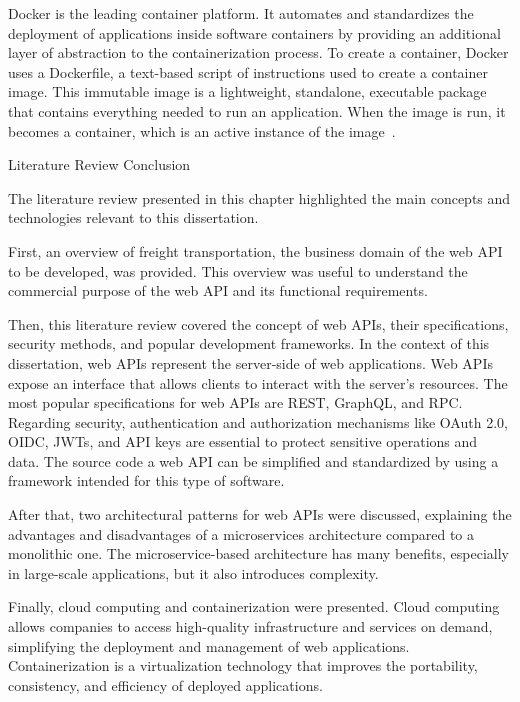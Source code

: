 \documentclass[12pt, reqno]{amsbook}
\makeatletter
\def\section{\@startsection{section}{1}%
      \z@{.5\linespacing\@plus.7\linespacing}{.25\linespacing}%
      {\normalfont\bfseries\flushleft}}
\theoremstyle{definition}
\theoremstyle{definition}
\numberwithin{section}{chapter}
\numberwithin{table}{chapter}
\numberwithin{figure}{chapter}
\makeatother
\begin{document}
Docker is the leading container platform. It automates and standardizes the deployment of applications inside software containers by providing an additional layer of abstraction to the containerization process. To create a container, Docker uses a Dockerfile, a text-based script of instructions used to create a container image. This immutable image is a lightweight, standalone, executable package that contains everything needed to run an application. When the image is run, it becomes a container, which is an active instance of the image~\cite{Figueira2024, Hardikar2021, Potdar2020}.

\section{Literature Review Conclusion}
\label{Section:Literature_Review_Conclusion}

The literature review presented in this chapter highlighted the main concepts and technologies relevant to this dissertation.

First, an overview of freight transportation, the business domain of the web \ac{API} to be developed, was provided. This overview was useful to understand the commercial purpose of the web \ac{API} and its functional requirements.

Then, this literature review covered the concept of web \acp{API}, their specifications, security methods, and popular development frameworks. In the context of this dissertation, web \acp{API} represent the server-side of web applications. Web \acp{API} expose an interface that allows clients to interact with the server's resources. The most popular specifications for web \acp{API} are \ac{REST}, GraphQL, and \ac{RPC}. Regarding security, authentication and authorization mechanisms like \ac{OAuth} 2.0, \ac{OIDC}, \acp{JWT}, and \ac{API} keys are essential to protect sensitive operations and data. The source code a web \ac{API} can be simplified and standardized by using a framework intended for this type of software.

After that, two architectural patterns for web \acp{API} were discussed, explaining the advantages and disadvantages of a microservices architecture compared to a monolithic one. The microservice-based architecture has many benefits, especially in large-scale applications, but it also introduces complexity.

Finally, cloud computing and containerization were presented. Cloud computing allows companies to access high-quality infrastructure and services on demand, simplifying the deployment and management of web applications. Containerization is a virtualization technology that improves the portability, consistency, and efficiency of deployed applications.
\end{document}
